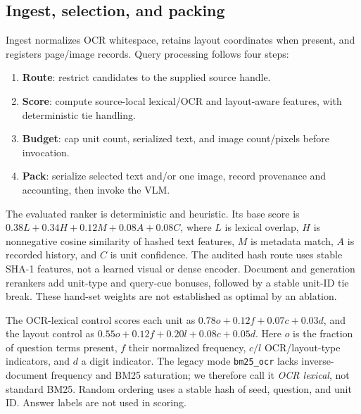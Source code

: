 ﻿\documentclass[conference]{IEEEtran}
\begin{document}
\subsection{Ingest, selection, and packing}
Ingest normalizes OCR whitespace, retains layout coordinates when present, and registers page/image records. Query processing follows four steps:
\begin{enumerate}
  \item \textbf{Route}: restrict candidates to the supplied source handle.
  \item \textbf{Score}: compute source-local lexical/OCR and layout-aware features, with deterministic tie handling.
  \item \textbf{Budget}: cap unit count, serialized text, and image count/pixels before invocation.
  \item \textbf{Pack}: serialize selected text and/or one image, record provenance and accounting, then invoke the VLM.
\end{enumerate}
The evaluated ranker is deterministic and heuristic. Its base score is $0.38L+0.34H+0.12M+0.08A+0.08C$, where $L$ is lexical overlap, $H$ is nonnegative cosine similarity of hashed text features, $M$ is metadata match, $A$ is recorded history, and $C$ is unit confidence. The audited hash route uses stable SHA-1 features, not a learned visual or dense encoder. Document and generation rerankers add unit-type and query-cue bonuses, followed by a stable unit-ID tie break. These hand-set weights are not established as optimal by an ablation.

The OCR-lexical control scores each unit as $0.78o+0.12f+0.07c+0.03d$, and the layout control as $0.55o+0.12f+0.20l+0.08c+0.05d$. Here $o$ is the fraction of question terms present, $f$ their normalized frequency, $c/l$ OCR/layout-type indicators, and $d$ a digit indicator. The legacy mode \texttt{bm25\_ocr} lacks inverse-document frequency and BM25 saturation; we therefore call it \emph{OCR lexical}, not standard BM25. Random ordering uses a stable hash of seed, question, and unit ID. Answer labels are not used in scoring.
\end{document}

